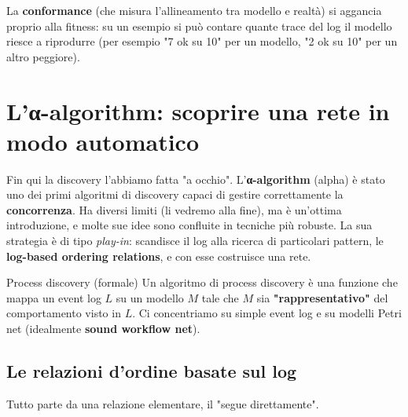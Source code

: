 La \textbf{conformance} (che misura l'allineamento tra modello e realtà) si aggancia proprio alla fitness: su un esempio si può contare quante trace del log il modello riesce a riprodurre (per esempio "7 ok su 10" per un modello, "2 ok su 10" per un altro peggiore).

\section{\texorpdfstring{L'α-algorithm: scoprire una rete in modo automatico}{L'α-algorithm: scoprire una rete in modo automatico}}

Fin qui la discovery l'abbiamo fatta "a occhio". L'\textbf{α-algorithm} (alpha) è stato uno dei primi algoritmi di discovery capaci di gestire correttamente la \textbf{concorrenza}. Ha diversi limiti (li vedremo alla fine), ma è un'ottima introduzione, e molte sue idee sono confluite in tecniche più robuste. La sua strategia è di tipo \emph{play-in}: scandisce il log alla ricerca di particolari pattern, le \textbf{log-based ordering relations}, e con esse costruisce una rete.

\begin{boxdefinition}{Process discovery (formale)}
Un algoritmo di process discovery è una funzione che mappa un event log $L$ su un modello $M$ tale che $M$ sia \textbf{"rappresentativo"} del comportamento visto in $L$. Ci concentriamo su simple event log e su modelli Petri net (idealmente \textbf{sound workflow net}).
\end{boxdefinition}

\subsection{\texorpdfstring{Le relazioni d'ordine basate sul log}{Le relazioni d'ordine basate sul log}}

Tutto parte da una relazione elementare, il "segue direttamente".

